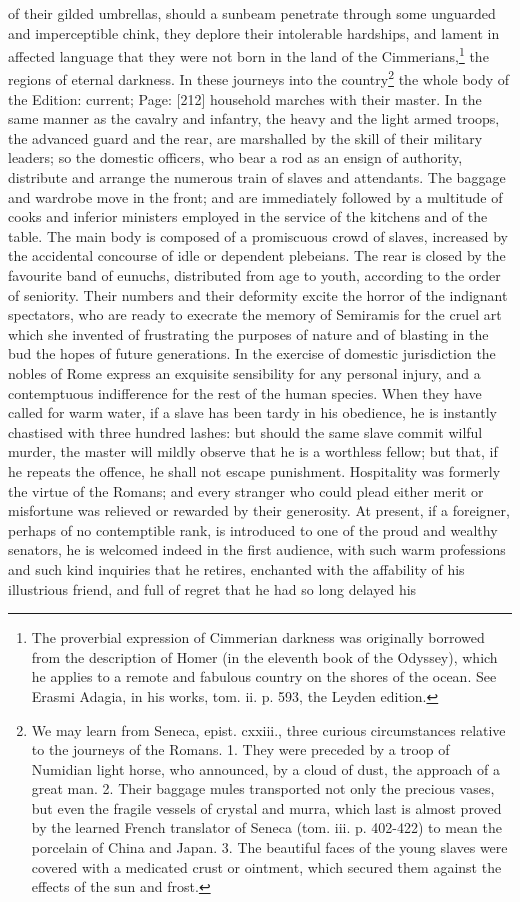 {of their gilded umbrellas, should a sunbeam penetrate through some unguarded and imperceptible chink, they deplore their intolerable hardships, and lament in affected language that they were not born in the land of the Cimmerians,\footnote{The proverbial expression of Cimmerian darkness was originally borrowed from the description of Homer (in the eleventh book of the Odyssey), which he applies to a remote and fabulous country on the shores of the ocean. See Erasmi Adagia, in his works, tom. ii. p. 593, the Leyden edition.} the regions of eternal darkness. In these journeys into the country\footnote{We may learn from Seneca, epist. cxxiii., three curious circumstances relative to the journeys of the Romans. 1. They were preceded by a troop of Numidian light horse, who announced, by a cloud of dust, the approach of a great man. 2. Their baggage mules transported not only the precious vases, but even the fragile vessels of crystal and murra, which last is almost proved by the learned French translator of Seneca (tom. iii. p. 402-422) to mean the porcelain of China and Japan. 3. The beautiful faces of the young slaves were covered with a medicated crust or ointment, which secured them against the effects of the sun and frost.} the whole body of the Edition: current; Page: [212] household marches with their master. In the same manner as the cavalry and infantry, the heavy and the light armed troops, the advanced guard and the rear, are marshalled by the skill of their military leaders; so the domestic officers, who bear a rod as an ensign of authority, distribute and arrange the numerous train of slaves and attendants. The baggage and wardrobe move in the front; and are immediately followed by a multitude of cooks and inferior ministers employed in the service of the kitchens and of the table. The main body is composed of a promiscuous crowd of slaves, increased by the accidental concourse of idle or dependent plebeians. The rear is closed by the favourite band of eunuchs, distributed from age to youth, according to the order of seniority. Their numbers and their deformity excite the horror of the indignant spectators, who are ready to execrate the memory of Semiramis for the cruel art which she invented of frustrating the purposes of nature and of blasting in the bud the hopes of future generations. In the exercise of domestic jurisdiction the nobles of Rome express an exquisite sensibility for any personal injury, and a contemptuous indifference for the rest of the human species. When they have called for warm water, if a slave has been tardy in his obedience, he is instantly chastised with three hundred lashes: but should the same slave commit wilful murder, the master will mildly observe that he is a worthless fellow; but that, if he repeats the offence, he shall not escape punishment. Hospitality was formerly the virtue of the Romans; and every stranger who could plead either merit or misfortune was relieved or rewarded by their generosity. At present, if a foreigner, perhaps of no contemptible rank, is introduced to one of the proud and wealthy senators, he is welcomed indeed in the first audience, with such warm professions and such kind inquiries that he retires, enchanted with the affability of his illustrious friend, and full of regret that he had so long delayed his }
